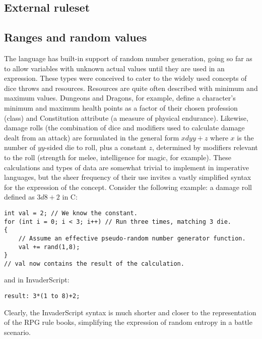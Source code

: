 \subsection{External ruleset}
\label{ref_external_rulebook}

\subsection{Ranges and random values}
The language has built-in support of random number generation, going so far as to allow variables with unknown actual values until they are used in an expression. These types were conceived to cater to the widely used concepts of dice throws and resources. Resources are quite often described with minimum and maximum values. Dungeons and Dragons, for example, define a character's minimum and maximum health points as a factor of their chosen profession (class) and Constitution attribute (a measure of physical endurance). Likewise, damage rolls (the combination of dice and modifiers used to calculate damage dealt from an attack) are formulated in the general form $xdyy+z$ where $x$ is the number of $yy$-sided die to roll, plus a constant $z$, determined by modifiers relevant to the roll (strength for melee, intelligence for magic, for example). These calculations and types of data are somewhat trivial to implement in imperative languages, but the sheer frequency of their use invites a vastly simplified syntax for the expression of the concept. Consider the following example: a damage roll defined as $3d8+2$ in C:
\begin{lstlisting}
int val = 2; // We know the constant.
for (int i = 0; i < 3; i++) // Run three times, matching 3 die.
{
    // Assume an effective pseudo-random number generator function.
    val += rand(1,8);
}
// val now contains the result of the calculation.
\end{lstlisting}
and in InvaderScript:
\begin{lstlisting}
result: 3*(1 to 8)+2;
\end{lstlisting}


Clearly, the InvaderScript syntax is much shorter and closer to the representation of the RPG rule books, simplifying the expression of random entropy  in a battle scenario.


